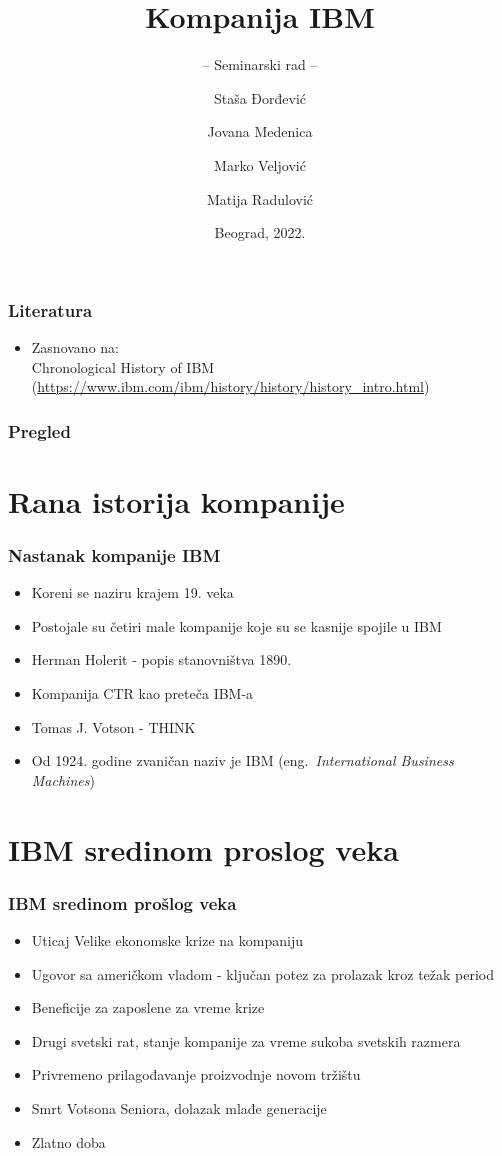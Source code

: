 \documentclass{beamer}
\title[]{Kompanija IBM}
\subtitle{-- Seminarski rad --}
\author[]{Staša Đorđević\and
Jovana Medenica\\\and  
Marko Veljović\and
Matija Radulović}
\institute[]{Matematički fakultet\\Univerzitet u Beogradu}
\date{
    \footnotesize{Beograd, 2022.}	
}
\begin{document}
\begin{frame}
	\thispagestyle{empty}
	\titlepage
\end{frame}

\begin{frame}[fragile]\frametitle{Literatura}
	\begin{itemize}
		\item Zasnovano na:\\
		Chronological History of IBM
		(\url{https://www.ibm.com/ibm/history/history/history_intro.html})
	\end{itemize}
\end{frame}

\begin{frame}
	\frametitle{Pregled} %
	\tableofcontents[hidesubsections] 
\end{frame}

\section{Rana istorija kompanije}

\begin{frame}[fragile]\frametitle{Nastanak kompanije IBM}
	\begin{itemize}	
		\item Koreni se naziru krajem 19. veka
		\item Postojale su četiri male kompanije koje su se kasnije spojile u IBM
		\item Herman Holerit - popis stanovništva 1890.
		\item Kompanija CTR kao preteča IBM-a
		\item Tomas J. Votson - THINK
		\item Od 1924. godine zvaničan naziv je IBM (eng.~{\em International Business Machines})
		\end{itemize}
\end{frame}

\section{IBM sredinom proslog veka}

\begin{frame}[fragile]\frametitle{IBM sredinom prošlog veka}
	\begin{itemize}	
		\item Uticaj Velike ekonomske krize na kompaniju
		\item Ugovor sa američkom vladom - ključan potez za prolazak kroz težak period
		\item Beneficije za zaposlene za vreme krize
            \item Drugi svetski rat, stanje kompanije za vreme sukoba svetskih razmera
            \item Privremeno prilagođavanje proizvodnje novom tržištu
            \item Smrt Votsona Seniora, dolazak mlađe generacije
            \item Zlatno doba
	\end{itemize}
\end{frame}
\end{document}
